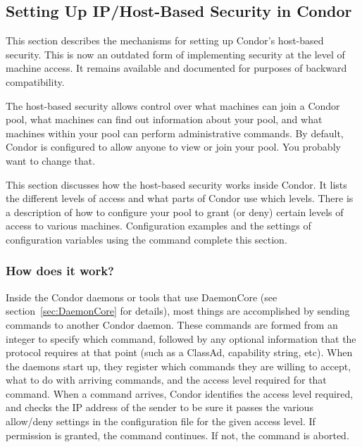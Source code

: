 \subsection{\label{sec:Host-Security}Setting Up IP/Host-Based Security in
Condor} 

This section describes the mechanisms for setting up Condor's
host-based security.  
This is now an outdated form of implementing security at
the level of machine access. 
It remains available and documented for purposes of backward compatibility.

The host-based security allows control over what machines can
join a Condor pool, what machines can find out information about
your pool, and what machines within your pool can perform
administrative commands.  By default, Condor is configured to allow
anyone to view or join your pool.  You probably want to change that.

This section discusses how the host-based security works inside Condor.
It lists the different levels of access and what
parts of Condor use which levels.
There is a description of how to configure
your pool to grant (or deny) certain levels of access to various
machines.
Configuration examples and the settings of configuration variables
using the  command complete this section.

\subsubsection{\label{sec:How-Host-Security-Works}How does it work?}

Inside the Condor daemons or tools that use DaemonCore (see
section~\ref{sec:DaemonCore} for details), most
things are accomplished by sending commands to another Condor daemon.
These commands are formed from an integer to specify which command,
followed
by any optional information that the protocol requires at that point
(such as a ClassAd, capability string, etc).
When the daemons start up,
they register which commands they are willing to accept, what to
do with arriving commands, and the access level required for
that command.
When a command arrives, Condor identifies the  access level
required, and checks the IP address of the sender to be
sure it passes the various allow/deny settings
in the configuration file for the given access level.
If permission is granted, the command continues. 
If not, the command is aborted.

